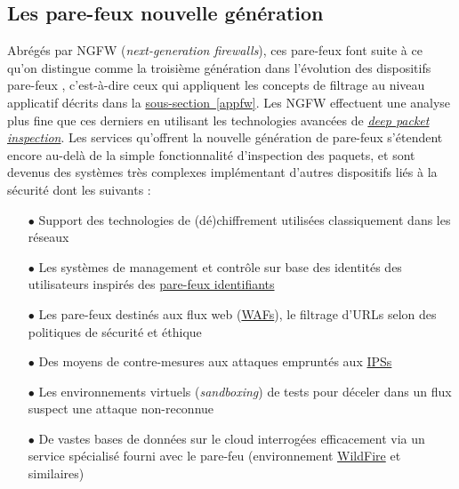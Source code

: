 \documentclass[]{article}
\begin{document}
\subsection{Les pare-feux nouvelle génération}

Abrégés par NGFW (\textit{next-generation firewalls}), ces pare-feux font suite à ce qu'on distingue comme la troisième génération dans l'évolution des dispositifs pare-feux \cite{wikifw}, c'est-à-dire ceux qui appliquent les concepts de filtrage au niveau applicatif décrits dans la \hyperref[appfw]{sous-section~\ref{appfw}}. Les NGFW effectuent une analyse plus fine que ces derniers en utilisant les technologies avancées de \href{https://en.wikipedia.org/wiki/Deep\_packet\_inspection}{\textit{deep packet inspection}}. Les services qu'offrent la nouvelle génération de pare-feux s'étendent encore au-delà de la simple fonctionnalité d'inspection des paquets, et sont devenus des systèmes très complexes implémentant d'autres dispositifs liés à la sécurité dont les suivants :
\vspace{0.2cm}
\begin{itemize}
\item[$\bullet$] Support des technologies de (dé)chiffrement utilisées classiquement dans les réseaux
\vspace{0.2cm}
\item[$\bullet$] Les systèmes de management et contrôle sur base des identités des utilisateurs inspirés des \hyperref[idfw]{pare-feux identifiants} 
\vspace{0.2cm}
\item[$\bullet$] Les pare-feux destinés aux flux web (\hyperref[waf]{WAFs}), le filtrage d'URLs selon des politiques de sécurité et éthique
\vspace{0.2cm}
\item[$\bullet$] Des moyens de contre-mesures aux attaques empruntés aux \hyperref[IPS]{IPSs}
\vspace{0.2cm}
\item[$\bullet$] Les environnements virtuels (\textit{sandboxing}) de tests pour déceler dans un flux suspect une attaque non-reconnue \cite{Kokko2017}
\vspace{0.2cm}
\item[$\bullet$] De vastes bases de données sur le cloud interrogées efficacement via un service spécialisé fourni avec le pare-feu (environnement \href{https://www.paloaltonetworks.com/documentation/80/wildfire/wf\_admin/wildfire-overview/wildfire-deployments/wildfire-global-cloud}{WildFire} et similaires)
\end{itemize}
\end{document}

